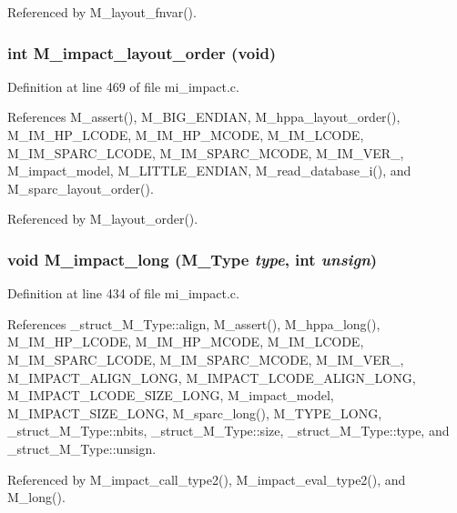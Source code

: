 Referenced by M\_\-layout\_\-fnvar().
\subsubsection{\setlength{\rightskip}{0pt plus 5cm}int M\_\-impact\_\-layout\_\-order (void)}\label{m__impact_8h_0188118ac57cf68b68affa3255bb0537}




Definition at line 469 of file mi\_\-impact.c.

References M\_\-assert(), M\_\-BIG\_\-ENDIAN, M\_\-hppa\_\-layout\_\-order(), M\_\-IM\_\-HP\_\-LCODE, M\_\-IM\_\-HP\_\-MCODE, M\_\-IM\_\-LCODE, M\_\-IM\_\-SPARC\_\-LCODE, M\_\-IM\_\-SPARC\_\-MCODE, M\_\-IM\_\-VER\_, M\_\-impact\_\-model, M\_\-LITTLE\_\-ENDIAN, M\_\-read\_\-database\_\-i(), and M\_\-sparc\_\-layout\_\-order().

Referenced by M\_\-layout\_\-order().
\subsubsection{\setlength{\rightskip}{0pt plus 5cm}void M\_\-impact\_\-long (\bf{M\_\-Type} {\em type}, int {\em unsign})}\label{m__impact_8h_a0c465cc15c576daef8c3948b7dbe65a}




Definition at line 434 of file mi\_\-impact.c.

References \_\-struct\_\-M\_\-Type::align, M\_\-assert(), M\_\-hppa\_\-long(), M\_\-IM\_\-HP\_\-LCODE, M\_\-IM\_\-HP\_\-MCODE, M\_\-IM\_\-LCODE, M\_\-IM\_\-SPARC\_\-LCODE, M\_\-IM\_\-SPARC\_\-MCODE, M\_\-IM\_\-VER\_, M\_\-IMPACT\_\-ALIGN\_\-LONG, M\_\-IMPACT\_\-LCODE\_\-ALIGN\_\-LONG, M\_\-IMPACT\_\-LCODE\_\-SIZE\_\-LONG, M\_\-impact\_\-model, M\_\-IMPACT\_\-SIZE\_\-LONG, M\_\-sparc\_\-long(), M\_\-TYPE\_\-LONG, \_\-struct\_\-M\_\-Type::nbits, \_\-struct\_\-M\_\-Type::size, \_\-struct\_\-M\_\-Type::type, and \_\-struct\_\-M\_\-Type::unsign.

Referenced by M\_\-impact\_\-call\_\-type2(), M\_\-impact\_\-eval\_\-type2(), and M\_\-long().
